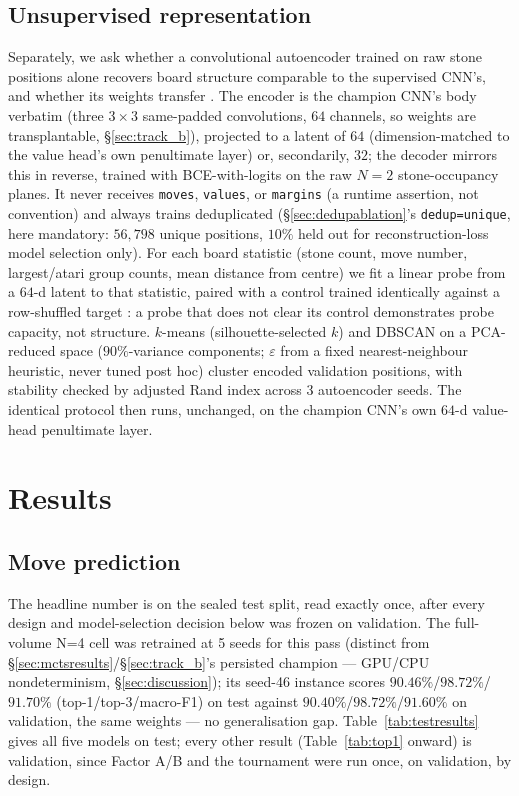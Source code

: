 \documentclass[conference,a4paper]{IEEEtran}
\begin{document}
\subsection{Unsupervised representation}
\label{sec:track_b_method}
Separately, we ask whether a convolutional autoencoder trained on raw stone
positions alone recovers board structure comparable to the supervised CNN's,
and whether its weights transfer \cite{hinton2006reducing}. The encoder is
the champion CNN's body verbatim (three $3{\times}3$ same-padded
convolutions, $64$ channels, so weights are transplantable,
\S\ref{sec:track_b}), projected to a latent of $64$ (dimension-matched to the
value head's own penultimate layer) or, secondarily, $32$; the decoder
mirrors this in reverse, trained with BCE-with-logits on the raw $N{=}2$
stone-occupancy planes. It never receives \texttt{moves}, \texttt{values}, or
\texttt{margins} (a runtime assertion, not convention) and always trains
deduplicated (\S\ref{sec:dedupablation}'s \texttt{dedup=unique}, here
mandatory: $56{,}798$ unique positions, $10\%$ held out for reconstruction-loss
model selection only). For each board statistic (stone count, move number,
largest/atari group counts, mean distance from centre) we fit a linear probe
from a $64$-d latent to that statistic, paired with a control trained
identically against a row-shuffled target \cite{hewitt2019designing}: a probe
that does not clear its control demonstrates probe capacity, not structure.
$k$-means (silhouette-selected $k$) and DBSCAN on a PCA-reduced space
($90\%$-variance components; $\varepsilon$ from a fixed nearest-neighbour
heuristic, never tuned post hoc) cluster encoded validation positions, with
stability checked by adjusted Rand index across 3 autoencoder seeds. The
identical protocol then runs, unchanged, on the champion CNN's own $64$-d
value-head penultimate layer.

\section{Results}
\label{sec:results}

\subsection{Move prediction}
The headline number is on the sealed test split, read exactly once, after
every design and model-selection decision below was frozen on validation.
The full-volume N=4 cell was retrained at 5 seeds for this pass (distinct
from \S\ref{sec:mctsresults}/\S\ref{sec:track_b}'s persisted champion ---
GPU/CPU nondeterminism, \S\ref{sec:discussion}); its seed-46 instance scores
$90.46\%$/$98.72\%$/$91.70\%$ (top-1/top-3/macro-F1) on test against
$90.40\%$/$98.72\%$/$91.60\%$ on validation, the same weights --- no
generalisation gap. Table~\ref{tab:testresults} gives all five models on
test; every other result (Table~\ref{tab:top1} onward) is validation, since
Factor A/B and the tournament were run once, on validation, by design.
\end{document}
